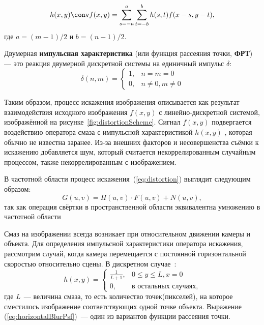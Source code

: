 \begin{equation}
h(x,y) \conv f(x,y) = \sum_{s=-a}^{a}\sum_{t=-b}^{b}h(s,t)f(x-s, y-t),
\end{equation}
где $a=(m-1)/2$ и $b = (n-1)/2$.

\begin{definition}\label{def:impulseResponse}
Двумерная \textbf{импульсная характеристика} (или функция рассеяния точки, \textbf{ФРТ}) — это реакция двумерной дискретной системы на единичный импульс $\delta$:
$$\delta(n,m) = 
	\begin{cases}
		1, &n=m=0\\
		0, &n\ne 0, m\ne 0
	\end{cases}$$
\end{definition}

Таким образом, процесс искажения изображения описывается как результат взаимодействия исходного изображения $f(x, y)$ с линейно-дискретной системой, изображённой на рисунке~\ref{fig:distortionScheme}. Сигнал $f(x, y)$ подвергается воздействию оператора смаза с импульсной характеристикой $h(x, y)$ , которая обычно не известна заранее. Из-за внешних факторов и несовершенства съёмки к искажению добавляется шум, который считается некоррелированным случайным процессом, также некоррелированным с изображением.

В частотной области процесс искажения~(\ref{eq:distortion}) выглядит следующим образом:
\begin{equation}\label{eq:distortionFourier}
G(u,v) = H(u,v)\cdot F(u,v) + N(u,v),
\end{equation}
так как операция свёртки в пространственной области эквивалентна умножению в частотной области~\cite[стр.~39]{basicsOfDigitalDataProcessing2016Umnyashkin}

Смаз на изображении всегда возникает при относительном движении камеры и объекта. Для определения импульсной характеристики оператора искажения, рассмотрим случай, когда камера перемещается с постоянной горизонтальной скоростью относительно сцены. В дискретном случае~\cite{iterableImageRestorationBiemonLangdeik}:
\begin{equation}\label{eq:horizontalBlurPsf}
	h(x,y) = 
		\begin{cases}
			\frac{1}{L+1}, & 0 \leq y \leq L, x=0\\
			0,             & \text{в остальных случаях},
		\end{cases}
\end{equation}
где \textit{L}~--- величина смаза, то есть количество точек(пикселей), на которое сместилось изображение соответствующих одной точке объекта. Выражение (\ref{eq:horizontalBlurPsf})~--- один из вариантов функции рассеяния точки.


